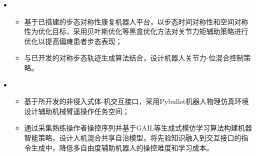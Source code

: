 \begin{itemize}[leftmargin=*]
  \item {}
  {\small
  \begin{itemize}
    \item 基于已搭建的步态对称性康复机器人平台，以步态时间对称性和空间对称性为优化目标，采用贝叶斯优化等黑盒优化方法对关节力矩辅助策略进行优化以提高偏瘫患者步态表现；
    \item 与已开发的对称步态轨迹生成算法结合，设计机器人关节力-位混合控制策略。
  \end{itemize}
  }
  \item {}
  {\small
  \begin{itemize}
    \item 基于所开发的非侵入式体-机交互接口，采用Pybullet机器人物理仿真环境设计辅助机械臂遥操作任务空间；
    \item 通过采集熟练操作者操控序列并基于GAIL等生成式模仿学习算法构建机器智能策略，设计人机混合共享自治模型，将先验知识融入到交互接口的指令生成中，降低多自由度辅助机器人的操控难度和学习成本。
  \end{itemize}
  }
\end{itemize}